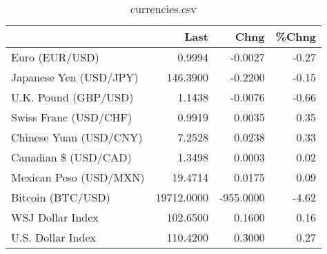 \documentclass{article}%
\begin{document}
%


\begin{table}[htbp]%
\caption{currencies.csv}%
\centering%
\begin{adjustbox}{width=1\textwidth}%
\begin{tabular}{lrrr}
\toprule
                       &       Last &      Chng &  \%Chng \\
\midrule
        Euro (EUR/USD) &     0.9994 &   -0.0027 &  -0.27 \\
Japanese Yen (USD/JPY) &   146.3900 &   -0.2200 &  -0.15 \\
  U.K. Pound (GBP/USD) &     1.1438 &   -0.0076 &  -0.66 \\
 Swiss Franc (USD/CHF) &     0.9919 &    0.0035 &   0.35 \\
Chinese Yuan (USD/CNY) &     7.2528 &    0.0238 &   0.33 \\
  Canadian \$ (USD/CAD) &     1.3498 &    0.0003 &   0.02 \\
Mexican Peso (USD/MXN) &    19.4714 &    0.0175 &   0.09 \\
     Bitcoin (BTC/USD) & 19712.0000 & -955.0000 &  -4.62 \\
      WSJ Dollar Index &   102.6500 &    0.1600 &   0.16 \\
     U.S. Dollar Index &   110.4200 &    0.3000 &   0.27 \\
\bottomrule
\end{tabular}
%
\end{adjustbox}%
\end{table}

%
\end{document}

